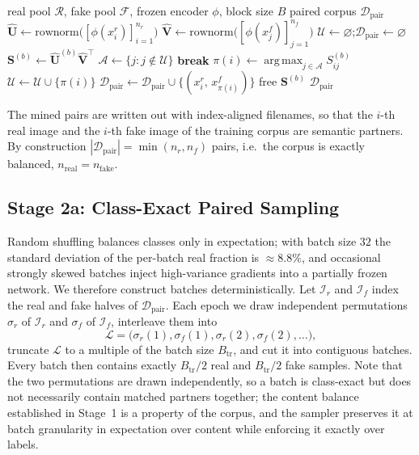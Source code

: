 \documentclass[10pt,journal]{IEEEtran}
\newcommand{\mat}[1]{\mathbf{#1}}
\DeclareMathOperator*{\argmax}{arg\,max}
\begin{document}
\begin{algorithm}[!t]
\caption{CLIP-Guided Semantic Pair Mining}
\label{alg:pairing}
\begin{algorithmic}[1]
\Require real pool $\mathcal{R}$, fake pool $\mathcal{F}$, frozen encoder
         $\phi$, block size $B$
\Ensure  paired corpus $\mathcal{D}_{\mathrm{pair}}$
\State $\hat{\mat{U}}\gets \mathrm{rownorm}\big([\phi(x^r_i)]_{i=1}^{n_r}\big)$
\State $\hat{\mat{V}}\gets \mathrm{rownorm}\big([\phi(x^f_j)]_{j=1}^{n_f}\big)$
\State $\mathcal{U}\gets\varnothing$;\quad $\mathcal{D}_{\mathrm{pair}}\gets\varnothing$
    \State $\mat{S}^{(b)}\gets \hat{\mat{U}}^{(b)}\hat{\mat{V}}^{\!\top}$
        \State $\mathcal{A}\gets\{j : j\notin\mathcal{U}\}$
         \State \textbf{break} \EndIf
        \State $\pi(i)\gets\argmax_{j\in\mathcal{A}} S^{(b)}_{ij}$
        \State $\mathcal{U}\gets\mathcal{U}\cup\{\pi(i)\}$
        \State $\mathcal{D}_{\mathrm{pair}}\gets\mathcal{D}_{\mathrm{pair}}
                \cup\{(x^r_i,\,x^f_{\pi(i)})\}$
    \EndFor
    \State free $\mat{S}^{(b)}$
\EndFor
\State \Return $\mathcal{D}_{\mathrm{pair}}$
\end{algorithmic}
\end{algorithm}

The mined pairs are written out with index-aligned filenames, so that the
$i$-th real image and the $i$-th fake image of the training corpus are
semantic partners. By construction $|\mathcal{D}_{\mathrm{pair}}|=
\min(n_r,n_f)$ pairs, i.e.\ the corpus is exactly balanced,
$n_{\mathrm{real}}=n_{\mathrm{fake}}$.

\subsection{Stage 2a: Class-Exact Paired Sampling}\label{sec:sampler}
Random shuffling balances classes only in expectation; with batch size $32$
the standard deviation of the per-batch real fraction is $\approx 8.8\%$, and
occasional strongly skewed batches inject high-variance gradients into a
partially frozen network. We therefore construct batches deterministically.
Let $\mathcal{I}_r$ and $\mathcal{I}_f$ index the real and fake halves of
$\mathcal{D}_{\mathrm{pair}}$. Each epoch we draw independent permutations
$\sigma_r$ of $\mathcal{I}_r$ and $\sigma_f$ of $\mathcal{I}_f$, interleave
them into
\begin{equation}
\mathcal{L}=\big(\sigma_r(1),\sigma_f(1),\sigma_r(2),\sigma_f(2),\dots\big),
\end{equation}
truncate $\mathcal{L}$ to a multiple of the batch size $B_{\mathrm{tr}}$, and
cut it into contiguous batches. Every batch then contains exactly
$B_{\mathrm{tr}}/2$ real and $B_{\mathrm{tr}}/2$ fake samples. Note that the
two permutations are drawn independently, so a batch is class-exact but does
not necessarily contain matched partners together; the content balance
established in Stage~1 is a property of the corpus, and the sampler preserves
it at batch granularity in expectation over content while enforcing it
exactly over labels.
\end{document}
